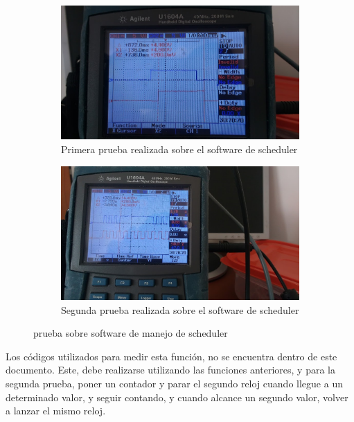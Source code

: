 \begin{figure}[ht]
	\begin{subfigure}{0.5\linewidth}
		\centering
		\includegraphics[width=\linewidth]{osciloscopio_im1} 
		\caption{Primera prueba realizada sobre el software de scheduler}
		\label{fig:osc_m1}	
	\end{subfigure}
	\hfill
	\begin{subfigure}{0.5\linewidth}
		\centering
		\includegraphics[width=\linewidth]{osciloscopio_im2}
		\caption{Segunda prueba realizada sobre el software de scheduler} 
		\label{fig:osc_m2}		
	\end{subfigure}
	\caption{prueba sobre software de manejo de scheduler}
\end{figure}

Los códigos utilizados para medir esta función, no se encuentra dentro de este documento. Este, debe realizarse utilizando las funciones anteriores, y para la segunda prueba, poner un contador y parar el segundo reloj cuando llegue a un determinado valor, y seguir contando, y cuando alcance un segundo valor, volver a lanzar el mismo reloj. 

